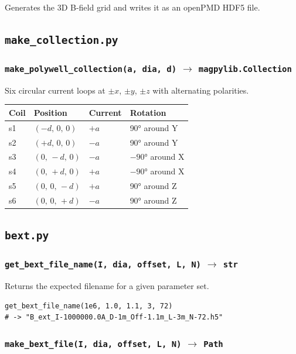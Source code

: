 \documentclass[11pt, a4paper]{article}
\begin{document}
Generates the 3D B-field grid and writes it as an openPMD HDF5 file.

\subsection{\texttt{make\_collection.py}}

\subsubsection*{\texttt{make\_polywell\_collection(a, dia, d)} $\to$ \texttt{magpylib.Collection}}

Six circular current loops at $\pm x$, $\pm y$, $\pm z$ with alternating polarities.

\begin{longtable}{L{1.5cm} L{3cm} L{2.5cm} L{6cm}}
\toprule
\textbf{Coil} & \textbf{Position} & \textbf{Current} & \textbf{Rotation} \\
\midrule
s1 & $(-d,\,0,\,0)$ & $+a$ & 90° around Y \\
s2 & $(+d,\,0,\,0)$ & $-a$ & 90° around Y \\
s3 & $(0,\,-d,\,0)$ & $-a$ & $-90°$ around X \\
s4 & $(0,\,+d,\,0)$ & $+a$ & $-90°$ around X \\
s5 & $(0,\,0,\,-d)$ & $+a$ & 90° around Z \\
s6 & $(0,\,0,\,+d)$ & $-a$ & 90° around Z \\
\bottomrule
\end{longtable}

\subsection{\texttt{bext.py}}

\subsubsection*{\texttt{get\_bext\_file\_name(I, dia, offset, L, N)} $\to$ \texttt{str}}

Returns the expected filename for a given parameter set.
\begin{lstlisting}[style=python]
get_bext_file_name(1e6, 1.0, 1.1, 3, 72)
# -> "B_ext_I-1000000.0A_D-1m_Off-1.1m_L-3m_N-72.h5"
\end{lstlisting}

\subsubsection*{\texttt{make\_bext\_file(I, dia, offset, L, N)} $\to$ \texttt{Path}}
\end{document}
